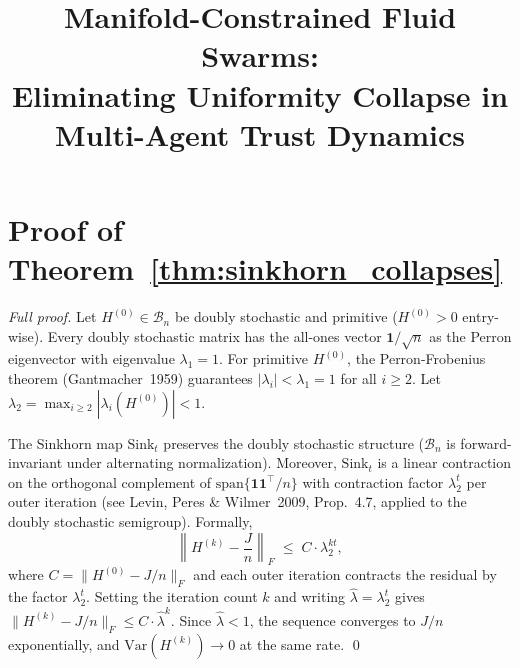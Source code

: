 \documentclass{iclr2025_conference}
\title{Manifold-Constrained Fluid Swarms: \\
Eliminating Uniformity Collapse in \\
Multi-Agent Trust Dynamics}
\author{
}
\begin{document}
\maketitle
















\appendix

\section{Proof of Theorem~\ref{thm:sinkhorn_collapses}}
\label{app:proof_sinkhorn}

\begin{proof}[Full proof]
  Let $H^{(0)} \in \mathcal{B}_n$ be doubly stochastic and primitive ($H^{(0)} > 0$
  entry-wise).  Every doubly stochastic matrix has the all-ones vector $\mathbf{1}/\sqrt{n}$
  as the Perron eigenvector with eigenvalue $\lambda_1 = 1$.  For primitive $H^{(0)}$, the
  Perron-Frobenius theorem (Gantmacher~1959) guarantees $|\lambda_i| < \lambda_1 = 1$ for
  all $i \geq 2$.  Let $\lambda_2 = \max_{i \geq 2} |\lambda_i(H^{(0)})| < 1$.

  The Sinkhorn map $\mathrm{Sink}_t$ preserves the doubly stochastic structure
  ($\mathcal{B}_n$ is forward-invariant under alternating normalization).  Moreover,
  $\mathrm{Sink}_t$ is a linear contraction on the orthogonal complement of
  $\mathrm{span}\{\mathbf{1}\mathbf{1}^\top / n\}$ with contraction factor $\lambda_2^t$
  per outer iteration (see Levin, Peres \& Wilmer~2009, Prop.~4.7, applied to the doubly
  stochastic semigroup).  Formally,
  \[
    \left\|H^{(k)} - \frac{J}{n}\right\|_F
    \;\leq\; C \cdot \lambda_2^{kt},
  \]
  where $C = \|H^{(0)} - J/n\|_F$ and each outer iteration contracts the residual by the
  factor $\lambda_2^t$.  Setting the iteration count $k$ and writing $\hat\lambda = \lambda_2^t$
  gives $\|H^{(k)} - J/n\|_F \leq C \cdot \hat\lambda^k$.  Since $\hat\lambda < 1$, the
  sequence converges to $J/n$ exponentially, and $\mathrm{Var}(H^{(k)}) \to 0$ at the
  same rate. \qed
\end{proof}
\end{document}
